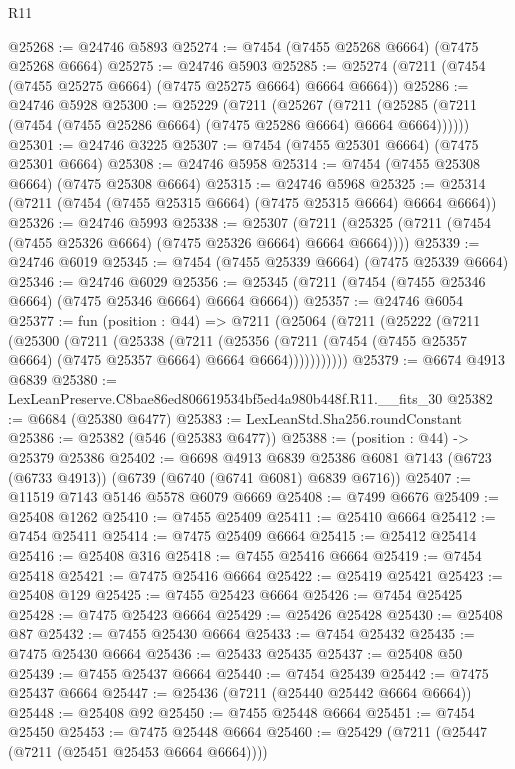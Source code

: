 \begin{lexlean}{R11}
\begin{coremodule}
@25268 := @24746 @5893
@25274 := @7454 (@7455 @25268 @6664) (@7475 @25268 @6664)
@25275 := @24746 @5903
@25285 := @25274 (@7211 (@7454 (@7455 @25275 @6664) (@7475 @25275 @6664) @6664 @6664))
@25286 := @24746 @5928
@25300 := @25229
    (@7211
      (@25267
        (@7211 (@25285 (@7211 (@7454 (@7455 @25286 @6664) (@7475 @25286 @6664) @6664 @6664))))))
@25301 := @24746 @3225
@25307 := @7454 (@7455 @25301 @6664) (@7475 @25301 @6664)
@25308 := @24746 @5958
@25314 := @7454 (@7455 @25308 @6664) (@7475 @25308 @6664)
@25315 := @24746 @5968
@25325 := @25314 (@7211 (@7454 (@7455 @25315 @6664) (@7475 @25315 @6664) @6664 @6664))
@25326 := @24746 @5993
@25338 := @25307
    (@7211 (@25325 (@7211 (@7454 (@7455 @25326 @6664) (@7475 @25326 @6664) @6664 @6664))))
@25339 := @24746 @6019
@25345 := @7454 (@7455 @25339 @6664) (@7475 @25339 @6664)
@25346 := @24746 @6029
@25356 := @25345 (@7211 (@7454 (@7455 @25346 @6664) (@7475 @25346 @6664) @6664 @6664))
@25357 := @24746 @6054
@25377 := fun (position : @44) =>
  @7211
    (@25064
      (@7211
        (@25222
          (@7211
            (@25300
              (@7211
                (@25338
                  (@7211
                    (@25356
                      (@7211 (@7454 (@7455 @25357 @6664) (@7475 @25357 @6664) @6664 @6664)))))))))))
@25379 := @6674 @4913 @6839
@25380 := LexLeanPreserve.C8bae86ed806619534bf5ed4a980b448f.R11.__fits_30
@25382 := @6684 (@25380 @6477)
@25383 := LexLeanStd.Sha256.roundConstant
@25386 := @25382 (@546 (@25383 @6477))
@25388 := (position : @44) -> @25379 @25386
@25402 := @6698
    @4913
    @6839
    @25386
    @6081
    @7143
    (@6723 (@6733 @4913))
    (@6739 (@6740 (@6741 @6081) @6839 @6716))
@25407 := @11519 @7143 @5146 @5578 @6079 @6669
@25408 := @7499 @6676
@25409 := @25408 @1262
@25410 := @7455 @25409
@25411 := @25410 @6664
@25412 := @7454 @25411
@25414 := @7475 @25409 @6664
@25415 := @25412 @25414
@25416 := @25408 @316
@25418 := @7455 @25416 @6664
@25419 := @7454 @25418
@25421 := @7475 @25416 @6664
@25422 := @25419 @25421
@25423 := @25408 @129
@25425 := @7455 @25423 @6664
@25426 := @7454 @25425
@25428 := @7475 @25423 @6664
@25429 := @25426 @25428
@25430 := @25408 @87
@25432 := @7455 @25430 @6664
@25433 := @7454 @25432
@25435 := @7475 @25430 @6664
@25436 := @25433 @25435
@25437 := @25408 @50
@25439 := @7455 @25437 @6664
@25440 := @7454 @25439
@25442 := @7475 @25437 @6664
@25447 := @25436 (@7211 (@25440 @25442 @6664 @6664))
@25448 := @25408 @92
@25450 := @7455 @25448 @6664
@25451 := @7454 @25450
@25453 := @7475 @25448 @6664
@25460 := @25429 (@7211 (@25447 (@7211 (@25451 @25453 @6664 @6664))))

\end{coremodule}
\end{lexlean}
